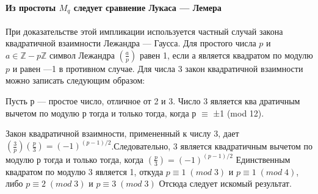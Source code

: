 \documentclass{mai_book}
\begin{document}
     \pagebreak
     
     
     
     \paragraph{Из простоты $M_q$  следует сравнение Лукаса — Лемера} 
     
     \noindent 
     
     При доказательстве этой импликации используется частный случай закона квадратичной взаимности Лежандра — Гаусса. Для простого  числа $p$ и $a \in \mathbb Z - p\mathbb Z$ символ Лежандра  $(\frac{a}{p})$ равен 1, если $а$ является
     квадратом по модулю $p$ и равен —1 в противном случае. Для числа 3  закон квадратичной взаимности можно записать следующим образом:
     
     \begin{lemma}
     \noindent
     
     Пусть $р$ — простое число, отличное от 2 и 3. Число 3 является ква дратичным вычетом по модулю $р$ тогда и только тогда, когда $р$ $\equiv$ ±1
     (mod 12).
     \end{lemma}
     \begin{myproof}
     \noindent
     
 	 
 	 	
 	 	Закон квадратичной взаимности, примененный к числу 3, дает  $(\frac{3}{p})(\frac{p}{3}) = (-1)^{(p-1)/2}$.Следовательно, 3 является квадратичным вычетом по модулю $р$ тогда и только тогда, когда $(\frac{p}{3}) = (-1)^{(p-1)/2}$ Единственным квадратом по модулю 3 является 1, откуда $p \equiv 1 \;(mod \; 3)$ и $p \equiv 1 \;(mod \; 4)$, либо $p \equiv 2 \;(mod \; 3)$ и $p \equiv 3 \;(mod \; 3)$ Отсюда следует искомый результат.
	 \end{myproof}
 
\end{document}
